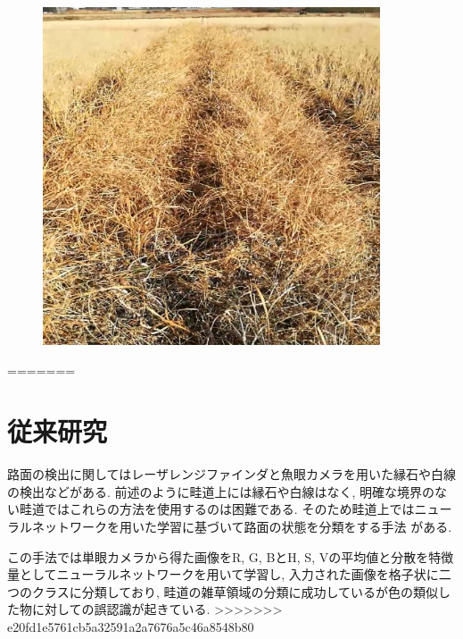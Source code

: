 \begin{figure}[htbp]
\begin{center}
\includegraphics[width=100mm]{figs/fig2.jpg}
\caption{}
\end{center}
\end{figure}

=======

\section{従来研究}


路面の検出に関してはレーザレンジファインダと魚眼カメラを用いた縁石や白線の検出\cite{土谷千加夫2015自律走行のための白線と縁石に基づく自己位置推定}などがある. 
前述のように畦道上には縁石や白線はなく, 明確な境界のない畦道ではこれらの方法を使用するのは困難である. 
そのため畦道上ではニューラルネットワークを用いた学習に基づいて路面の状態を分類をする手法
\cite{長橋孝哉2019ニューラルネットワークを用いた畦道の雑草検出に関する研究}がある.

この手法では単眼カメラから得た画像をR, G, BとH, S, Vの平均値と分散を特徴量としてニューラルネットワークを用いて学習し, 
入力された画像を格子状に二つのクラスに分類しており, 畦道の雑草領域の分類に成功しているが色の類似した物に対しての誤認識が起きている.
>>>>>>> e20fd1e5761cb5a32591a2a7676a5c46a8548b80



